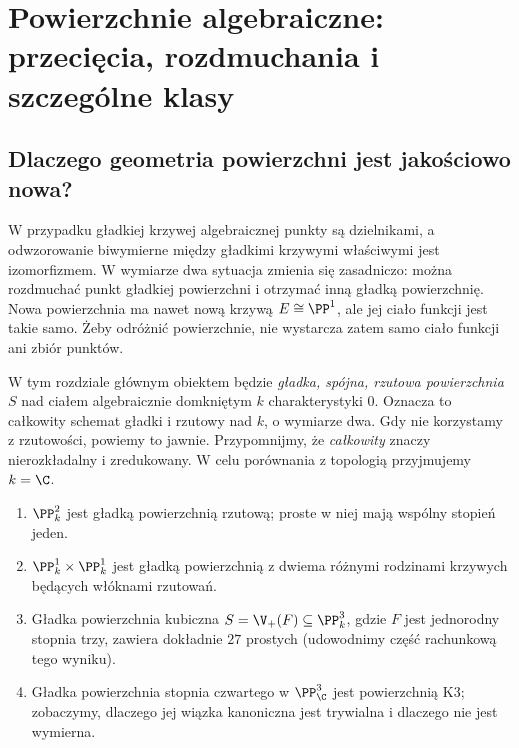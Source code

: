 \chapter{Powierzchnie algebraiczne: przecięcia, rozdmuchania i szczególne klasy}
\label{ch:ga6-powierzchnie}

\providecommand{\atlasref}[2]{#2}


\section{Dlaczego geometria powierzchni jest jakościowo nowa?}
\label{sec:ga6-motywacja}

W przypadku gładkiej krzywej algebraicznej punkty są dzielnikami,
a odwzorowanie biwymierne między gładkimi krzywymi właściwymi jest
izomorfizmem. W wymiarze dwa sytuacja zmienia się zasadniczo:
można rozdmuchać punkt gładkiej powierzchni i otrzymać inną gładką
powierzchnię. Nowa powierzchnia ma nawet nową krzywą $E\cong\PP^1$,
ale jej ciało funkcji jest takie samo. Żeby odróżnić powierzchnie,
nie wystarcza zatem samo ciało funkcji ani zbiór punktów.

W tym rozdziale głównym obiektem będzie \emph{gładka, spójna,
rzutowa powierzchnia} $S$ nad ciałem algebraicznie domkniętym
$k$ charakterystyki $0$. Oznacza to całkowity schemat gładki i
rzutowy nad $k$, o wymiarze dwa. Gdy nie korzystamy z rzutowości,
powiemy to jawnie. Przypomnijmy, że \emph{całkowity} znaczy
nierozkładalny i zredukowany. W celu porównania z topologią
przyjmujemy $k=\C$.

\begin{przyklad}
\label{prz:ga6-examples}
\begin{enumerate}[label=(\roman*)]
\item $\PP^2_k$ jest gładką powierzchnią rzutową; proste w niej
      mają wspólny stopień jeden.
\item $\PP^1_k\times\PP^1_k$ jest gładką powierzchnią z dwiema
      różnymi rodzinami krzywych będących włóknami rzutowań.
\item Gładka powierzchnia kubiczna $S=\V_+(F)\subseteq\PP^3_k$,
      gdzie $F$ jest jednorodny stopnia trzy, zawiera dokładnie
      $27$ prostych (udowodnimy część rachunkową tego wyniku).
\item Gładka powierzchnia stopnia czwartego w $\PP^3_\C$
      jest powierzchnią K3; zobaczymy, dlaczego jej wiązka
      kanoniczna jest trywialna i dlaczego nie jest wymierna.
\end{enumerate}
\end{przyklad}

